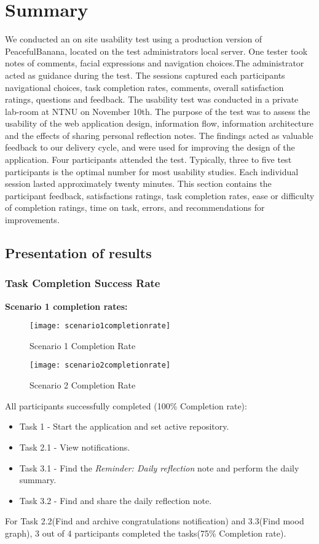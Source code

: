\section{Summary}
We conducted an on site usability test using a production version of PeacefulBanana, located on the test administrators local server. One tester took notes of comments, facial expressions and navigation choices.The administrator acted as guidance during the test. The sessions captured each participants navigational choices, task completion rates, comments, overall satisfaction ratings, questions and feedback.
The usability test was conducted in a private lab-room at NTNU on November 10th. The purpose of the test was to assess the usability of the web application design, information flow, information architecture and the effects of sharing personal reflection notes. The findings acted as valuable feedback to our delivery cycle, and were used for improving the design of the application. 
Four participants attended the test. Typically, three to five test participants is the optimal number for most usability studies\citep{nielsen1993mathematical}. Each individual session lasted approximately twenty minutes.
This section contains the participant feedback, satisfactions ratings, task completion rates, ease or difficulty of completion ratings, time on task, errors, and recommendations for improvements.
\subsection{Presentation of results}
\subsubsection{Task Completion Success Rate}
\textbf{Scenario 1 completion rates:}
\begin{figure}[h!]
    \centering
        \texttt{[image: scenario1completionrate]}
    \caption{Scenario 1 Completion Rate}
    \label{scenario1completionrate}
\end{figure}
\begin{figure}[h!]
    \centering
        \texttt{[image: scenario2completionrate]}
    \caption{Scenario 2 Completion Rate}
    \label{scenario2completionrate}
\end{figure}
All participants successfully completed (100\% Completion rate):
\begin{itemize}
	\item Task 1 - Start the application and set active repository. 
	\item Task 2.1 - View notifications. 
	\item Task 3.1 - Find the \emph{Reminder: Daily reflection} note and perform the daily summary. 
	\item Task 3.2 - Find and share the daily reflection note.
\end{itemize}
For Task 2.2(Find and archive congratulations notification) and 3.3(Find mood graph), 3 out of 4 participants completed the tasks(75\% Completion rate). \\

